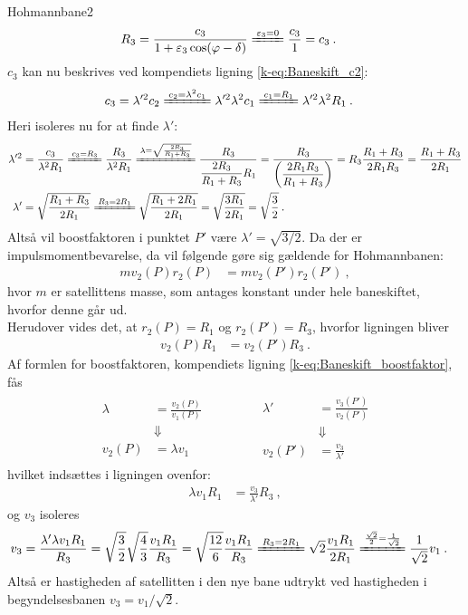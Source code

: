 \begin{opgave}{Hohmannbane}{2}
\begin{align*}
	R_3 &= \frac{c_3}{1+\epsilon_3\cos(\phi-\delta)}
	\xleq{\epsilon_3 = 0}
	\frac{c_3}{1} = c_3 \: .
\end{align*}
$c_3$ kan nu beskrives ved kompendiets ligning \eqref{k-eq:Baneskift_c2}:
\begin{align*}
	c_3 &= \lambda'^2 c_2
	\xleq{c_2 = \lambda^2 c_1}
	\lambda'^2 \lambda^2 c_1
	\xleq{c_1 = R_1}
	\lambda'^2 \lambda^2 R_1 \: .
\end{align*}
Heri isoleres nu for at finde $\lambda'$:
\begin{align*}
	\lambda'^2 &= \frac{c_3}{\lambda^2 R_1}
	\xleq{c_3 = R_3}
	\frac{R_3}{\lambda^2 R_1}
	\xleq{\lambda = \sqrt{\frac{2R_3}{R_1+R_3}}}
	\frac{R_3}{\dfrac{2R_3}{R_1+R_3} R_1}
	= \frac{R_3}{\left(\dfrac{2R_1R_3}{R_1+R_3}\right)}
	= R_3 \frac{R_1+R_3}{2R_1R_3}
	= \frac{R_1+R_3}{2R_1} \\
	\lambda' &= \sqrt{\frac{R_1+R_3}{2R_1}}
	\xleq{R_3 = 2R_1}
	\sqrt{\frac{R_1+2R_1}{2R_1}}
	= \sqrt{\frac{3R_1}{2R_1}}
	= \sqrt{\frac{3}{2}} \: .
\end{align*}
Altså vil boostfaktoren i punktet $P'$ være $\lambda' = \sqrt{3/2}$.
%
\opg Da der er impulsmomentbevarelse, da vil følgende gøre sig gældende for Hohmannbanen:
\begin{align*}
	m v_2(P)r_2(P) &= m v_2(P')r_2(P') \: ,
\end{align*}
hvor $m$ er satellittens masse, som antages konstant under hele baneskiftet, hvorfor denne går ud.\\
Herudover vides det, at $r_2(P) = R_1$ og $r_2(P') = R_3$, hvorfor ligningen bliver
\begin{align*}
	v_2(P)R_1 &= v_2(P')R_3 \: .
\end{align*}
Af formlen for boostfaktoren, kompendiets ligning \eqref{k-eq:Baneskift_boostfaktor}, fås
\begin{align*}
	\begin{aligned}
		\lambda &= \frac{v_2(P)}{v_1(P)} \\
		&\Downarrow \\
		v_2(P) &= \lambda v_1
	\end{aligned}
	\qquad \qquad
	\begin{aligned}
		\lambda' &= \frac{v_3(P')}{v_2(P')} \\
		&\Downarrow \\
		v_2(P') &= \frac{v_3}{\lambda'}
	\end{aligned}
\end{align*}
hvilket indsættes i ligningen ovenfor:
\begin{align*}
	\lambda v_1 R_1 &= \frac{v_3}{\lambda'} R_3 \: ,
\end{align*}
og $v_3$ isoleres
\begin{align*}
	v_3 &= \frac{\lambda' \lambda v_1 R_1}{R_3}
	= \sqrt{\frac{3}{2}} \sqrt{\frac{4}{3}}\frac{v_1 R_1}{R_3}
	= \sqrt{\frac{12}{6}} \frac{v_1 R_1}{R_3}
	\xleq{R_3 = 2R_1}
	\sqrt{2} \frac{v_1 R_1}{2R_1}
	\xleq{\frac{\sqrt{2}}{2} = \frac{1}{\sqrt{2}}}
	\frac{1}{\sqrt{2}} v_1 \: .
\end{align*}
Altså er hastigheden af satellitten i den nye bane udtrykt ved hastigheden i begyndelsesbanen $v_3 = v_1/\sqrt{2}$.
\end{opgave}
